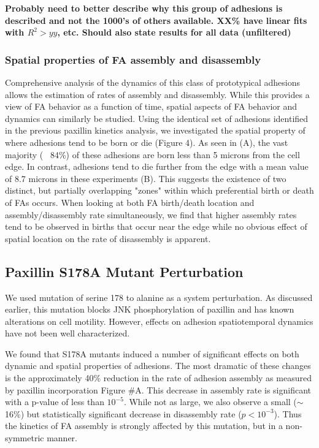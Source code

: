 \documentclass[10pt]{article}
\begin{document}
\textbf{Probably need to better describe why this group of adhesions is
described and not the 1000's of others available. XX\% have linear fits with
$R^2 > yy$, etc. Should also state results for all data (unfiltered)} 

\subsubsection*{Spatial properties of FA assembly and disassembly}

Comprehensive analysis of the dynamics of this class of prototypical adhesions
allows the estimation of rates of assembly and disassembly. While this provides
a view of FA behavior as a function of time, spatial aspects of FA behavior and
dynamics can similarly be studied. Using the identical set of adhesions
identified in the previous paxillin kinetics analysis, we investigated the
spatial property of where adhesions tend to be born or die (Figure 4). As seen
in (A), the vast majority (~ 84\%) of these adhesions are born less than 5
microns from the cell edge. In contrast, adhesions tend to die further from the
edge with a mean value of 8.7 microns in these experiments (B). This suggests
the existence of two distinct, but partially overlapping "zones" within which
preferential birth or death of FAs occurs. When looking at both FA birth/death
location and assembly/disassembly rate simultaneously, we find that higher
assembly rates tend to be observed in births that occur near the edge while no
obvious effect of spatial location on the rate of disassembly is apparent. 


\subsection*{Paxillin S178A Mutant Perturbation}

We used mutation of serine 178 to alanine as a system perturbation. As discussed earlier, this
mutation blocks JNK phosphorylation of paxillin and has known alterations on
cell motility. However, effects on adhesion spatiotemporal dynamics have not
been well characterized.

We found that S178A mutants induced a number of significant effects on both
dynamic and spatial properties of adhesions. The most dramatic of these changes
is the approximately 40\% reduction in the rate of adhesion assembly as measured
by paxillin incorporation Figure \#A. This decrease in assembly rate is
significant with a p-value of less than $10^{-5}$. While not as large, we also
observe a small ($\sim$16\%) but statistically significant decrease in
disassembly rate ($p<10^{-3}$). Thus the kinetics of FA assembly is strongly
affected by this mutation, but in a non-symmetric manner.
\end{document}
